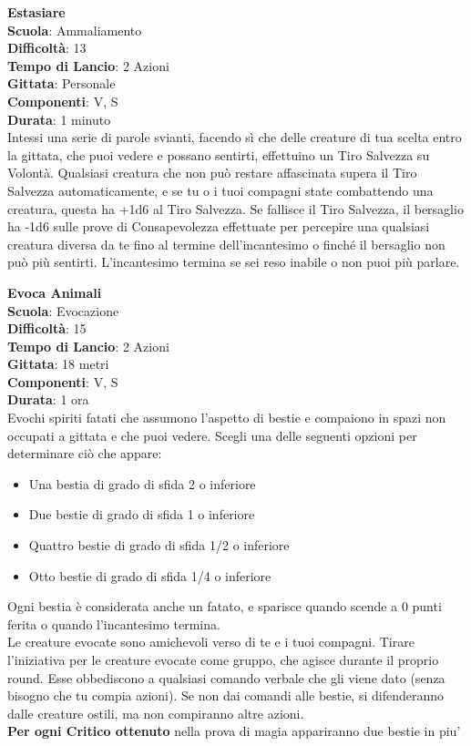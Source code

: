 \begin{multicols}{2}
\medskip\textbf{Estasiare}\\
\textbf{Scuola}: Ammaliamento\\
\textbf{Difficoltà}: 13\\
\textbf{Tempo di Lancio}: 2 Azioni\\
\textbf{Gittata}: Personale\\
\textbf{Componenti}: V, S\\
\textbf{Durata}: 1 minuto\\
Intessi una serie di parole svianti, facendo sì che delle creature di tua scelta entro la gittata, che puoi vedere e possano sentirti, effettuino un Tiro Salvezza su Volontà. Qualsiasi creatura che non può restare affascinata supera il Tiro Salvezza automaticamente, e se tu o i tuoi compagni state combattendo una creatura, questa ha +1d6 al Tiro Salvezza. Se fallisce il Tiro Salvezza, il bersaglio ha -1d6 sulle prove di Consapevolezza effettuate per percepire una qualsiasi creatura diversa da te fino al termine dell'incantesimo o finché il bersaglio non può più sentirti.
L'incantesimo termina se sei reso inabile o non puoi più parlare.

\medskip\textbf{Evoca Animali}\\
\textbf{Scuola}: Evocazione\\
\textbf{Difficoltà}: 15\\
\textbf{Tempo di Lancio}: 2 Azioni\\
\textbf{Gittata}: 18 metri\\
\textbf{Componenti}: V, S\\
\textbf{Durata}: 1 ora\\
Evochi spiriti fatati che assumono l'aspetto di bestie e compaiono in spazi non occupati a gittata e che puoi vedere. Scegli una delle seguenti opzioni per determinare ciò che appare:
\begin{itemize}
\item
Una bestia di grado di sfida 2 o inferiore
\item
Due bestie di grado di sfida 1 o inferiore
\item
Quattro bestie di grado di sfida 1/2 o inferiore
\item
Otto bestie di grado di sfida 1/4 o inferiore
\end{itemize}
\medskip
Ogni bestia è considerata anche un fatato, e sparisce quando scende a 0 punti ferita o quando l'incantesimo termina. \\
Le creature evocate sono amichevoli verso di te e i tuoi compagni. Tirare l'iniziativa per le creature evocate come gruppo, che agisce durante il proprio round. Esse obbediscono a qualsiasi comando verbale che gli viene dato (senza bisogno che tu compia azioni). Se non dai comandi alle bestie, si difenderanno dalle creature ostili, ma non compiranno altre azioni.\\
\textbf{Per ogni Critico ottenuto} nella prova di magia appariranno due bestie in piu'


\end{multicols}
